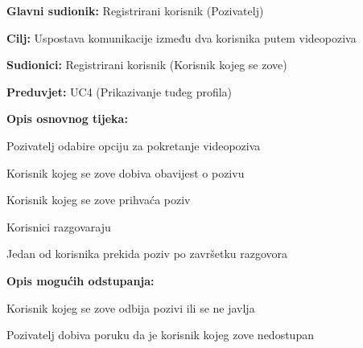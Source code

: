 					\noindent {}
					\begin{packed_item}
						\item \textbf{Glavni sudionik: }Registrirani korisnik (Pozivatelj)
						\item \textbf{Cilj: }Uspostava komunikacije između dva korisnika putem videopoziva
						\item \textbf{Sudionici: }Registrirani korisnik (Korisnik kojeg se zove)
						\item \textbf{Preduvjet: }UC4 (Prikazivanje tuđeg profila)
						\item \textbf{Opis osnovnog tijeka:}
						
						\item[] \begin{packed_enum}
							\item Pozivatelj odabire opciju za pokretanje videopoziva
							\item Korisnik kojeg se zove dobiva obavijest o pozivu
							\item Korisnik kojeg se zove prihvaća poziv
							\item Korisnici razgovaraju
							\item Jedan od korisnika prekida poziv po završetku razgovora
						\end{packed_enum}
						\item \textbf{Opis mogućih odstupanja:}
						\item[] \begin{packed_enum}
							\item[3.a] Korisnik kojeg se zove odbija pozivi ili se ne javlja
							\begin{packed_enum}
								\item[1.] Pozivatelj dobiva poruku da je korisnik kojeg zove nedostupan
							\end{packed_enum}
						\end{packed_enum}
					\end{packed_item}
					
